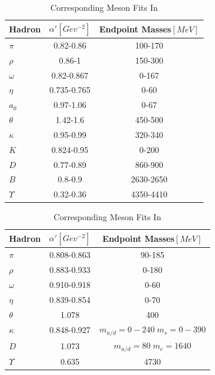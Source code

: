 \documentclass[11pt,a4paper]{article}
\begin{document}
\begin{table}[h]
\centering
\begin{tabular}{|l|c|c|}
\hline
Hadron & $\alpha '\left[Gev^{-2}\right]$ & Endpoint Masses$\left[MeV\right]$ \\ \hline
$\pi$ & 0.82-0.86 & 100-170 \\
$\rho$  & 0.86-1 & 150-300 \\
$\omega$  & 0.82-0.867 & 0-167 \\
$\eta$  & 0.735-0.765 & 0-60 \\
$a_0$ & 0.97-1.06 & 0-67 \\
$\theta$  & 1.42-1.6 & 450-500 \\
$\kappa$  & 0.95-0.99 & 320-340 \\
$K$ & 0.824-0.95 & 0-200 \\
$D$ & 0.77-0.89 & 860-900 \\
$B$ & 0.8-0.9 & 2630-2650 \\
$\varUpsilon$  & 0.32-0.36 & 4350-4410 \\
\hline
\end{tabular}
\caption{Meson Fits Summary Table}
\label{tab:mesonsum}

\centering
\begin{tabular}{|l|c|c|}
\hline
Hadron & $\alpha '\left[Gev^{-2}\right]$ & Endpoint Masses$\left[MeV\right]$ \\ \hline
$\pi$ & 0.808-0.863 & 90-185 \\
$\rho$  & 0.883-0.933 & 0-180 \\
$\omega$  & 0.910-0.918 & 0-60 \\
$\eta$  & 0.839-0.854 & 0-70 \\
$\theta$  & 1.078 & 400 \\
$\kappa$  & 0.848-0.927 & $m_{u/d}=0-240\; m_s=0-390$ \\
$D$ & 1.073 & $m_{u/d}=80\; m_c=1640$ \\
$\varUpsilon$  & 0.635 & 4730 \\
\hline
\end{tabular}
\caption{Corresponding Meson Fits In \cite{Sonnenschein14}}
\label{tab:mesonsumdorin}
\end{table}
\end{document}
